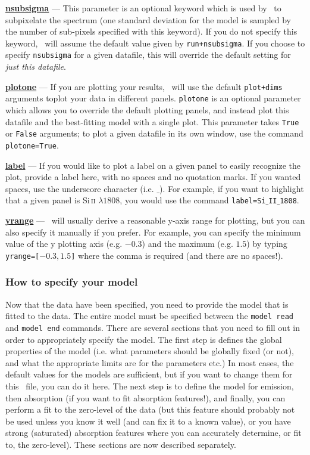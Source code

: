 \textbf{\underline{nsubsigma}} --- This parameter is an optional keyword which is used by
     \alis\ to subpixelate the spectrum (one standard deviation for the model is sampled
     by the number of sub-pixels specified with this keyword). If you do not specify this keyword,
     \alis\ will assume the default value given by \texttt{run+nsubsigma}. If you choose to specify
     \texttt{nsubsigma} for a given datafile, this will override the default setting for \textit{just this datafile}.

\textbf{\underline{plotone}} --- If you are plotting your results, \alis\ will use the default \texttt{plot+dims}
     arguments toplot your data in different panels. \texttt{plotone} is an optional parameter which allows
     you to override the default plotting panels, and instead plot this datafile and the best-fitting model
     with a single plot. This parameter takes \texttt{True} or \texttt{False} arguments; to plot a given datafile
     in its own window, use the command \texttt{plotone=True}.

\textbf{\underline{label}} --- If you would like to plot a label on a given panel to easily recognize the plot,
     provide a label here, with no spaces and no quotation marks. If you wanted spaces, use the underscore
     character (i.e. $\_$). For example, if you want to highlight that a given panel is Si\,\textsc{ii} $\lambda1808$,
     you would use the command \texttt{label=Si$\_$II$\_$1808}.

\textbf{\underline{yrange}} --- \alis\ will usually derive a reasonable y-axis range for plotting, but you
     can also specify it manually if you prefer. For example, you can specify the minimum value of the
     y plotting axis (e.g. $-0.3$) and the maximum (e.g. $1.5$) by typing \texttt{yrange=[$-0.3,1.5$]} where
     the comma is required (and there are no spaces!).


\subsubsection{How to specify your model}
\label{sec:specifymodel}

Now that the data have been specified, you need to provide the model
that is fitted to the data. The entire model must be specified between the
\texttt{model read} and \texttt{model end} commands. There are several
sections that you need to fill out in order to appropriately specify the model.
The first step is defines the global properties of the model (i.e. what parameters
should be globally fixed (or not), and what the appropriate limits are for the
parameters etc.) In most cases, the default values for the models are sufficient,
but if you want to change them for this \dmod\ file, you can do it here. The next
step is to define the model for emission, then absorption (if you want to fit
absorption features!), and finally, you can perform a fit to the zero-level of the
data (but this feature should probably not be used unless you know
it well (and can fix it to a known value), or you have strong (saturated) absorption
features where you can accurately determine, or fit to, the zero-level). These
sections are now described separately.

